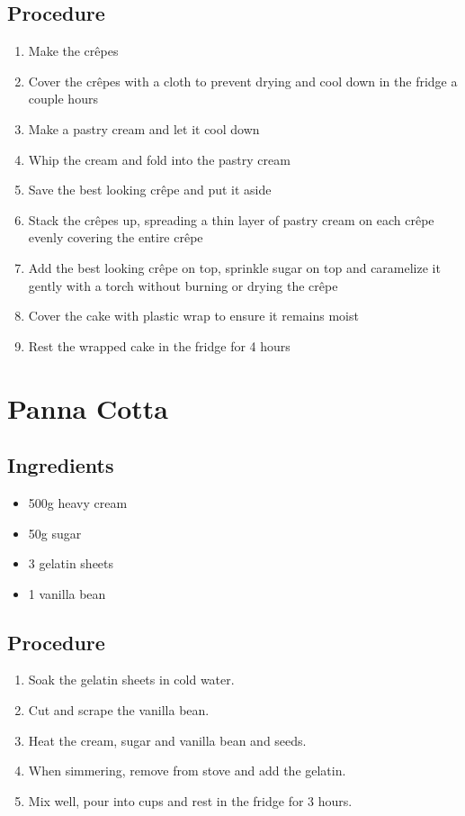 \documentclass[10pt]{book}
\newcommand{\ecirc}{\^{e}}
\begin{document}
\subsection*{Procedure}
	\begin{enumerate}
		\item Make the cr{\ecirc}pes
		\item Cover the cr{\ecirc}pes with a cloth to prevent drying and cool down in the fridge a couple hours
		\item Make a pastry cream and let it cool down
		\item Whip the cream and fold into the pastry cream
		\item Save the best looking cr{\ecirc}pe and put it aside
		\item Stack the cr{\ecirc}pes up, spreading a thin layer of pastry cream on each cr{\ecirc}pe evenly covering the entire cr{\ecirc}pe
		\item Add the best looking cr{\ecirc}pe on top, sprinkle sugar on top and caramelize it gently with a torch without burning or drying the cr{\ecirc}pe
		\item Cover the cake with plastic wrap to ensure it remains moist
		\item Rest the wrapped cake in the fridge for 4 hours
	\end{enumerate}
\newpage


\newpage
\section*{Panna Cotta}
\subsection*{Ingredients}
	\begin{itemize}
		\item 500g heavy cream
		\item 50g sugar
		\item 3 gelatin sheets
		\item 1 vanilla bean
	\end{itemize}
\subsection*{Procedure}
	\begin{enumerate}
		\item Soak the gelatin sheets in cold water.
		\item Cut and scrape the vanilla bean.
		\item Heat the cream, sugar and vanilla bean and seeds.
		\item When simmering, remove from stove and add the gelatin.
		\item Mix well, pour into cups and rest in the fridge for 3 hours.
	\end{enumerate}
\newpage
\end{document}
